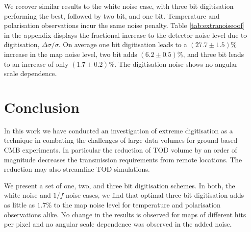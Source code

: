 \documentclass[apj]{emulateapj}
\begin{document}
We recover similar results to the white noise case, with three bit digitisation performing the best, followed by two bit, and one bit. Temperature and polarisation observations incur the same noise penalty. Table \ref{tab:extranoiseoof} in the appendix displays the fractional increase to the detector noise level due to digitisation, $\Delta \sigma / \sigma$. On average one bit digitisation leads to a $(27.7\pm 1.5)\%$ increase in the map noise level, two bit adds $(6.2\pm0.5)\%$, and three bit leads to an increase of only $(1.7\pm0.2)\%$. The digitisation noise shows no angular scale dependence.


\section{Conclusion}
\label{sec:conclusions}

In this work we have conducted an investigation of extreme digitisation as a technique in combating the challenges of large data volumes for ground-based CMB experiments. In particular the reduction of TOD volume by an order of magnitude decreases the transmission requirements from remote locations. The reduction may also streamline TOD simulations.

We present a set of one, two, and three bit digitisation schemes. In both, the white noise and $1/f$ noise cases, we find that optimal three bit digitisation adds as little as $1.7\%$ to the map noise level for temperature and polarisation observations alike. No change in the results is observed for maps of different hits per pixel and no angular scale dependence was observed in the added noise.

\end{document}
